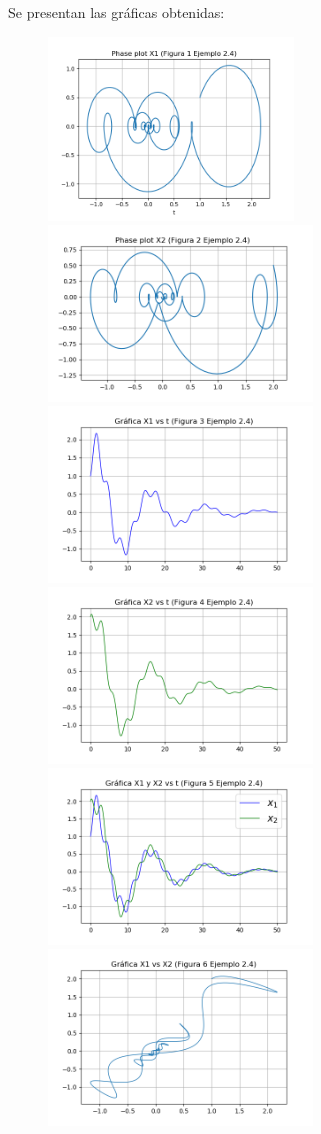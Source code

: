 \documentclass[a4paper]{article}
\begin{document}
\newpage
Se presentan las gráficas obtenidas:
\begin{figure}[ht!]
\centering 
\includegraphics[width=65mm]{Figura1Ex2_4.png}
\includegraphics[width=70mm]{Figura2Ex2_4.png}
\includegraphics[width=70mm]{Figura3Ex2_4.png}
\includegraphics[width=70mm]{Figura4Ex2_4.png}
\includegraphics[width=70mm]{Figura5Ex2_4.png}
\includegraphics[width=70mm]{Figura6Ex2_4.png}
\end{figure}
\end{document}
